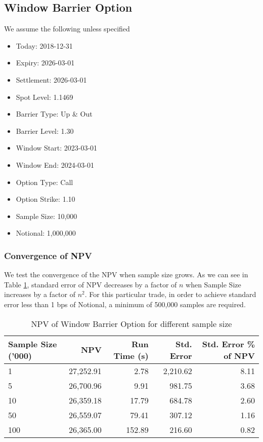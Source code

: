 \subsection{Window Barrier Option}

We assume the following unless specified

\begin{itemize}
\item Today: 2018-12-31
\item Expiry: 2026-03-01
\item Settlement: 2026-03-01
\item Spot Level: 1.1469
\item Barrier Type: Up \& Out
\item Barrier Level: 1.30
\item Window Start: 2023-03-01
\item Window End: 2024-03-01
\item Option Type: Call
\item Option Strike: 1.10
\item Sample Size: 10,000
\item Notional: 1,000,000
\end{itemize}


\subsubsection{Convergence of NPV}
We test the convergence of the NPV when sample size grows. As we can see in Table \ref{window_barrier_npv_sample_convergence},
standard error of NPV decreases by a factor of $n$ when Sample Size increases by a factor of $n^2$. For this particular trade,
in order to achieve standard error less than 1 bps of Notional, a minimum of 500,000 samples are required.

\begin{table}[!htbp]
  \centering
  \begin{tabular}{l | r | r | r | r}
    Sample Size ('000) & NPV & Run Time (s) & Std. Error & Std. Error \% of NPV \\ \hline
     1 & 27,252.91 & 2.78 & 2,210.62 & 8.11 \\
     5 & 26,700.96 & 9.91 & 981.75 & 3.68 \\
     10 & 26,359.18 & 17.79 & 684.78 & 2.60 \\
     50 & 26,559.07 & 79.41 & 307.12 & 1.16 \\
     100 & 26,365.00 & 152.89 & 216.60 & 0.82
  \end{tabular}
  \caption{NPV of Window Barrier Option for different sample size}
  \label{window_barrier_npv_sample_convergence}
\end{table}

